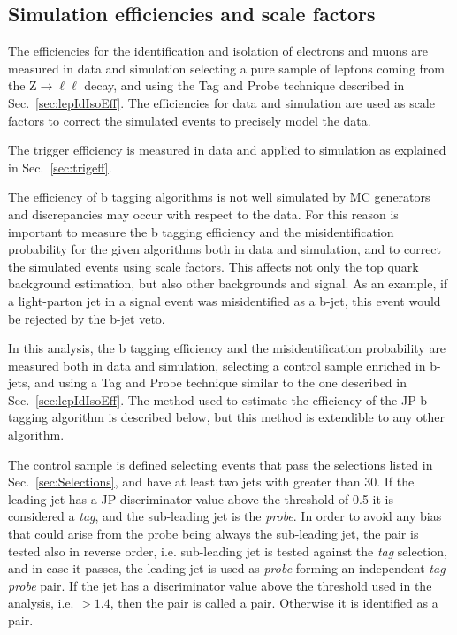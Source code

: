 \subsection{Simulation efficiencies and scale factors}\label{sec:ScaleFactors}
The efficiencies for the identification and isolation of electrons and muons are measured in data and simulation selecting a pure sample of leptons coming from the $\mathrm{Z\to\ell\ell}$ decay, and using the Tag and Probe technique described in Sec.~\ref{sec:lepIdIsoEff}. The efficiencies for data and simulation are used as scale factors to correct the simulated events to precisely model the data.

The trigger efficiency is measured in data and applied to simulation as explained in Sec.~\ref{sec:trigeff}.

The efficiency of b tagging algorithms is not well simulated by MC generators and discrepancies may occur with respect to the data. For this reason is important to measure the b tagging efficiency and the misidentification probability for the given algorithms both in data and simulation, and to correct the simulated events using scale factors. This affects not only the top quark background estimation, but also other backgrounds and signal. As an example, if a light-parton jet in a signal event was misidentified as a b-jet, this event would be rejected by the b-jet veto.

In this analysis, the b tagging efficiency and the misidentification probability are measured both in data and simulation, selecting a control sample enriched in b-jets, and using a Tag and Probe technique similar to the one described in Sec.~\ref{sec:lepIdIsoEff}. The method used to estimate the efficiency of the JP b tagging algorithm is described below, but this method is extendible to any other algorithm.

The control sample is defined selecting events that pass the selections listed in Sec.~\ref{sec:Selections}, and have at least two jets with \pt greater than 30\GeV. If the leading jet has a JP discriminator value above the threshold of 0.5 it is considered a \emph{tag}, and the sub-leading jet is the \emph{probe}. In order to avoid any bias that could arise from the probe being always the sub-leading jet, the pair is tested also in reverse order, i.e. sub-leading jet is tested against the \emph{tag} selection, and in case it passes, the leading jet is used as \emph{probe} forming an independent \emph{tag-probe} pair. If the \probe jet has a discriminator value above the threshold used in the analysis, i.e. $>1.4$, then the \tp pair is called a \tpp pair. Otherwise it is identified as a \tfp pair.

